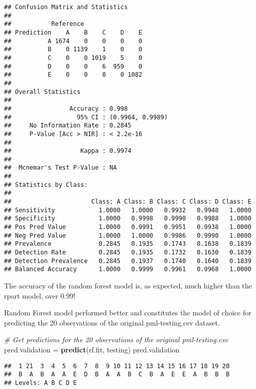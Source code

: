 \documentclass[]{article}
\newenvironment{Shaded}{\begin{snugshade}}{\end{snugshade}}
\newcommand{\CommentTok}[1]{\textcolor[rgb]{0.56,0.35,0.01}{\textit{#1}}}
\newcommand{\DataTypeTok}[1]{\textcolor[rgb]{0.13,0.29,0.53}{#1}}
\newcommand{\KeywordTok}[1]{\textcolor[rgb]{0.13,0.29,0.53}{\textbf{#1}}}
\newcommand{\NormalTok}[1]{#1}
\newcommand{\OperatorTok}[1]{\textcolor[rgb]{0.81,0.36,0.00}{\textbf{#1}}}
\newcommand{\StringTok}[1]{\textcolor[rgb]{0.31,0.60,0.02}{#1}}
\begin{document}
\begin{verbatim}
## Confusion Matrix and Statistics
## 
##           Reference
## Prediction    A    B    C    D    E
##          A 1674    0    0    0    0
##          B    0 1139    1    0    0
##          C    0    0 1019    5    0
##          D    0    0    6  959    0
##          E    0    0    0    0 1082
## 
## Overall Statistics
##                                           
##                Accuracy : 0.998           
##                  95% CI : (0.9964, 0.9989)
##     No Information Rate : 0.2845          
##     P-Value [Acc > NIR] : < 2.2e-16       
##                                           
##                   Kappa : 0.9974          
##                                           
##  Mcnemar's Test P-Value : NA              
## 
## Statistics by Class:
## 
##                      Class: A Class: B Class: C Class: D Class: E
## Sensitivity            1.0000   1.0000   0.9932   0.9948   1.0000
## Specificity            1.0000   0.9998   0.9990   0.9988   1.0000
## Pos Pred Value         1.0000   0.9991   0.9951   0.9938   1.0000
## Neg Pred Value         1.0000   1.0000   0.9986   0.9990   1.0000
## Prevalence             0.2845   0.1935   0.1743   0.1638   0.1839
## Detection Rate         0.2845   0.1935   0.1732   0.1630   0.1839
## Detection Prevalence   0.2845   0.1937   0.1740   0.1640   0.1839
## Balanced Accuracy      1.0000   0.9999   0.9961   0.9968   1.0000
\end{verbatim}

The accuracy of the random forest model is, as expected, much higher
than the rpart model, over 0.99!

Random Forest model performed better and constitutes the model of choice
for predicting the 20 observations of the original pml-testing.csv
dataset.

\begin{Shaded}
\begin{Highlighting}[]
\CommentTok{# Get predictions for the 20 observations of the original pml-testing.csv}
\NormalTok{pred.validation =}\StringTok{ }\KeywordTok{predict}\NormalTok{(rf.fit, testing)}
\NormalTok{pred.validation}
\end{Highlighting}
\end{Shaded}

\begin{verbatim}
##  1 21  3  4  5  6  7  8  9 10 11 12 13 14 15 16 17 18 19 20 
##  B  A  B  A  A  E  D  B  A  A  B  C  B  A  E  E  A  B  B  B 
## Levels: A B C D E
\end{verbatim}

\begin{Shaded}
\end{Shaded}
\end{document}
